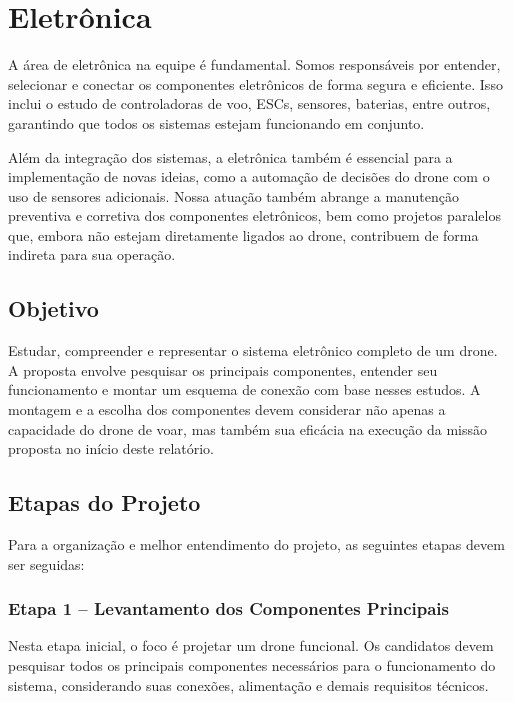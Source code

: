 \section{Eletrônica}

A área de eletrônica na equipe é fundamental. Somos responsáveis por entender, selecionar e conectar os componentes eletrônicos de forma segura e eficiente. Isso inclui o estudo de controladoras de voo, ESCs, sensores, baterias, entre outros, garantindo que todos os sistemas estejam funcionando em conjunto.

Além da integração dos sistemas, a eletrônica também é essencial para a implementação de novas ideias, como a automação de decisões do drone com o uso de sensores adicionais. Nossa atuação também abrange a manutenção preventiva e corretiva dos componentes eletrônicos, bem como projetos paralelos que, embora não estejam diretamente ligados ao drone, contribuem de forma indireta para sua operação.

\subsection*{Objetivo}

Estudar, compreender e representar o sistema eletrônico completo de um drone. A proposta envolve pesquisar os principais componentes, entender seu funcionamento e montar um esquema de conexão com base nesses estudos. A montagem e a escolha dos componentes devem considerar não apenas a capacidade do drone de voar, mas também sua eficácia na execução da missão proposta no início deste relatório.

\subsection*{Etapas do Projeto}

Para a organização e melhor entendimento do projeto, as seguintes etapas devem ser seguidas:

\subsubsection*{Etapa 1 – Levantamento dos Componentes Principais}

Nesta etapa inicial, o foco é projetar um drone funcional. Os candidatos devem pesquisar todos os principais componentes necessários para o funcionamento do sistema, considerando suas conexões, alimentação e demais requisitos técnicos.

